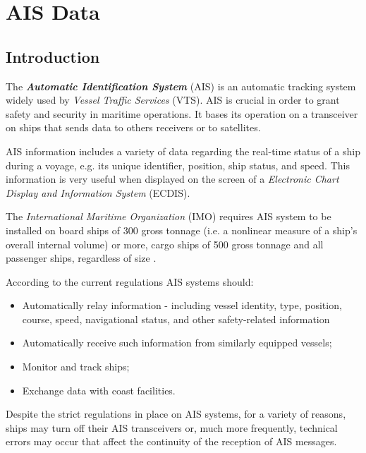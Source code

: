 \clearpage

\clearpage

\section{AIS Data}
\label{sec:ais}
    \subsection{Introduction}
    The \textit{\textbf{Automatic Identification System}} (AIS) is an automatic tracking system widely used by \textit{Vessel Traffic Services} (VTS). AIS is crucial in order to grant safety and security in maritime operations.
    It bases its operation on a transceiver on ships that sends data to others receivers or to satellites.
    
    AIS information includes a variety of data regarding the real-time status of a ship during a voyage, e.g. its unique identifier, position, ship status, and speed. This information is very useful when displayed on the screen of a \textit{Electronic Chart Display and Information System} (ECDIS).
    
    The \textit{International Maritime Organization} (IMO) requires AIS system to be installed on board ships of 300 gross tonnage (i.e. a nonlinear measure of a ship's overall internal volume) or more, cargo ships of 500 gross tonnage and all passenger ships, regardless of size \cite{ais_regulations}.
    
    According to the current regulations AIS systems should:
    \begin{itemize}
        \item Automatically relay information - including vessel identity, type, position, course, speed, navigational status, and other safety-related information
        \item Automatically receive such information from similarly equipped vessels; 
        \item Monitor and track ships;
        \item Exchange data with coast facilities.
    \end{itemize}

    Despite the strict regulations in place on AIS systems, for a variety of reasons, ships may turn off their AIS transceivers or, much more frequently, technical errors may occur that affect the continuity of the reception of AIS messages.
    
